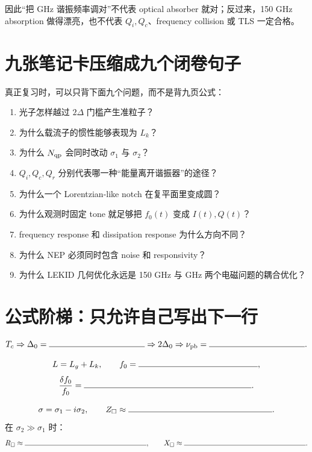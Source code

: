 \documentclass[11pt,a4paper,openany]{ctexrep}
\begin{document}
\begin{mistakebox}
因此“把 GHz 谐振频率调对”不代表 optical absorber 就对；反过来，150 GHz absorption 做得漂亮，也不代表 $Q_i,Q_c$、frequency collision 或 TLS 一定合格。
\end{mistakebox}

\section{九张笔记卡压缩成九个闭卷句子}

真正复习时，可以只背下面九个问题，而不是背九页公式：
\begin{enumerate}
  \item 光子怎样越过 $2\Delta$ 门槛产生准粒子？
  \item 为什么载流子的惯性能够表现为 $L_k$？
  \item 为什么 $N_{\rm qp}$ 会同时改动 $\sigma_1$ 与 $\sigma_2$？
  \item $Q_i,Q_c,Q_r$ 分别代表哪一种“能量离开谐振器”的途径？
  \item 为什么一个 Lorentzian-like notch 在复平面里变成圆？
  \item 为什么观测时固定 tone 就足够把 $f_0(t)$ 变成 $I(t),Q(t)$？
  \item frequency response 和 dissipation response 为什么方向不同？
  \item 为什么 NEP 必须同时包含 noise 和 responsivity？
  \item 为什么 LEKID 几何优化永远是 150 GHz 与 GHz 两个电磁问题的耦合优化？
\end{enumerate}

\section{公式阶梯：只允许自己写出下一行}

\begin{notebookbox}[title=公式阶梯 A：从 $T_c$ 到 pair breaking]
\[
T_c
\Rightarrow
\Delta_0=\rule{4cm}{0.4pt}
\Rightarrow
2\Delta_0
\Rightarrow
\nu_{\rm pb}=\rule{4cm}{0.4pt}.
\]
\end{notebookbox}

\begin{notebookbox}[title=公式阶梯 B：从 $L_k$ 到谐振频移]
\[
L=L_g+L_k,
\qquad
f_0=\rule{5cm}{0.4pt},
\]
\[
\frac{\delta f_0}{f_0}=\rule{7cm}{0.4pt}.
\]
\end{notebookbox}

\begin{notebookbox}[title=公式阶梯 C：从复电导到薄膜表面阻抗]
\[
\sigma=\sigma_1-i\sigma_2,
\qquad
Z_{\Box}\approx\rule{6cm}{0.4pt}.
\]
在 $\sigma_2\gg\sigma_1$ 时：
\[
R_{\Box}\approx\rule{6cm}{0.4pt},
\qquad
X_{\Box}\approx\rule{6cm}{0.4pt}.
\]
\end{notebookbox}
\end{document}

